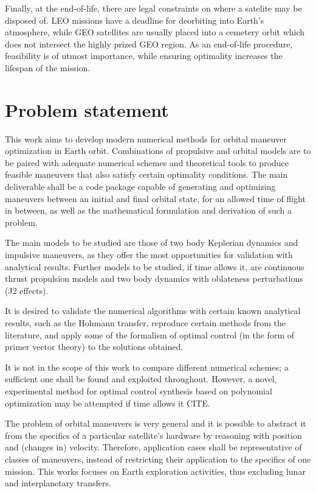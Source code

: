 Finally, at the end-of-life, there are legal constraints on where a satelite may be disposed of. LEO missions have a deadline for deorbiting into Earth's atmosphere, while GEO satellites are usually placed into a cemetery orbit which does not intersect the highly prized GEO region. As an end-of-life procedure, feasibility is of utmost importance, while ensuring optimality increases the lifespan of the mission.

\section{Problem statement}

This work aims to develop modern numerical methods for orbital maneuver optimization in Earth orbit. Combinations of propulsive and orbital models are to be paired with adequate numerical schemes and theoretical tools to produce feasible maneuvers that also satisfy certain optimality conditions. The main deliverable shall be a code package capable of generating and optimizing maneuvers between an initial and final orbital state, for an allowed time of flight in between, as well as the mathematical formulation and derivation of such a problem.

The main models to be studied are those of two body Keplerian dynamics and impulsive maneuvers, as they offer the most opportunities for validation with analytical results. Further models to be studied, if time allows it, are continuous thrust propulsion models and two body dynamics with oblateness perturbations (J2 effects).

It is desired to validate the numerical algorithms with certain known analytical results, such as the Hohmann transfer, reproduce certain methods from the literature, and apply some of the formalism of optimal control (in the form of primer vector theory) to the solutions obtained. 

It is not in the scope of this work to compare different numerical schemes; a sufficient one shall be found and exploited throughout. However, a novel, experimental method for optimal control synthesis based on polynomial optimization may be attempted if time allows it CITE\@.

The problem of orbital maneuvers is very general and it is possible to abstract it from the specifics of a particular satellite's hardware by reasoning with position and (changes in) velocity. Therefore, application cases shall be representative of classes of maneuvers, instead of restricting their application to the specifics of one mission. This works focuses on Earth exploration activities, thus excluding lunar and interplanetary transfers.


